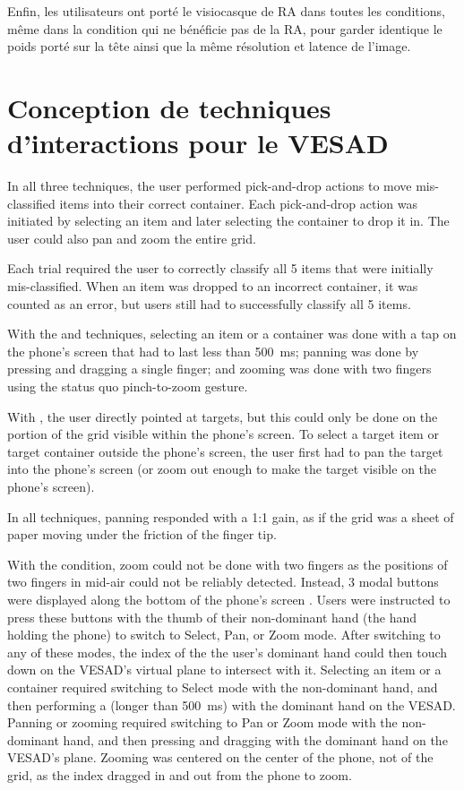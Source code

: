 Enfin, les utilisateurs ont porté le visiocasque de RA  dans toutes les conditions, même dans la condition  qui ne bénéficie pas de la RA, pour garder identique le poids porté sur la tête ainsi que la même résolution et latence de l'image.


\section{Conception de techniques d'interactions pour le VESAD}
\label{sec:experiment_interactions}

In all three techniques, the user performed pick-and-drop actions to move mis-classified items into their correct container. Each pick-and-drop action was initiated by selecting an item and later selecting the container to drop it in. The user could also pan and zoom the entire grid.

Each trial required the user to correctly classify all 5 items that were initially mis-classified. When an item was dropped to an incorrect container, it was counted as an error, but users still had to successfully classify all 5 items.

With the  and  techniques, selecting an item or a container was done with a tap on the phone's screen that had to last less than \SI{500}{\ms}; panning was done by pressing and dragging a single finger; and zooming was done with two fingers using the status quo pinch-to-zoom gesture.

With , the user directly pointed at targets, but this could only be done on the portion of the grid visible within the phone's screen. To select a target item or target container outside the phone's screen, the user first had to pan the target into the phone's screen (or zoom out enough to make the target visible on the phone's screen).

In all techniques, panning responded with a 1:1 gain, as if the grid was a sheet of paper moving under the friction of the finger tip.

With the  condition, zoom could not be done with two fingers as the positions of two fingers in mid-air could not be reliably detected. Instead, 3 modal buttons were displayed along the bottom of the phone's screen . Users were instructed to press these buttons with the thumb of their non-dominant hand (the hand holding the phone) to switch to Select, Pan, or Zoom mode. After switching to any of these modes, the index of the the user's dominant hand could then touch down on the VESAD's virtual plane to intersect with it. Selecting an item or a container required switching to Select mode with the non-dominant hand, and then performing a  (longer than \SI{500}{\ms}) with the dominant hand on the VESAD. Panning or zooming required switching to Pan or Zoom mode with the non-dominant hand, and then pressing and dragging with the dominant hand on the VESAD's plane. Zooming was centered on the center of the phone, not of the grid, as the index dragged in and out from the phone to zoom.

